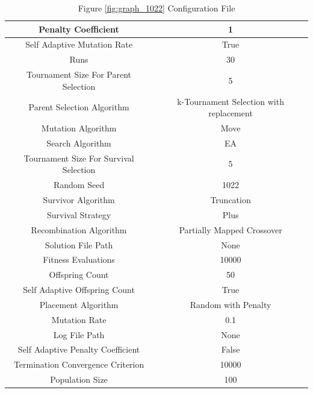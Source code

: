 \documentclass{standalone}
\begin{document}
\begin{table}[!htb]
	\centering
	\caption{Figure \ref{fig:graph_1022} Configuration File}
	\label{tab:graph_1022}
	\begin{tabular}{| c | c |}
		\hline
		Penalty Coefficient		& 1		 \\
		\hline
		Self Adaptive Mutation Rate		& True		 \\
		\hline
		Runs		& 30		 \\
		\hline
		Tournament Size For Parent Selection		& 5		 \\
		\hline
		Parent Selection Algorithm		& k-Tournament Selection with replacement		 \\
		\hline
		Mutation Algorithm		& Move		 \\
		\hline
		Search Algorithm		& EA		 \\
		\hline
		Tournament Size For Survival Selection		& 5		 \\
		\hline
		Random Seed		& 1022		 \\
		\hline
		Survivor Algorithm		& Truncation		 \\
		\hline
		Survival Strategy		& Plus		 \\
		\hline
		Recombination Algorithm		& Partially Mapped Crossover		 \\
		\hline
		Solution File Path		& None		 \\
		\hline
		Fitness Evaluations		& 10000		 \\
		\hline
		Offspring Count		& 50		 \\
		\hline
		Self Adaptive Offspring Count		& True		 \\
		\hline
		Placement Algorithm		& Random with Penalty		 \\
		\hline
		Mutation Rate		& 0.1		 \\
		\hline
		Log File Path		& None		 \\
		\hline
		Self Adaptive Penalty Coefficient		& False		 \\
		\hline
		Termination Convergence Criterion		& 10000		 \\
		\hline
		Population Size		& 100		 \\
		\hline
	\end{tabular}
\end{table}
\end{document}
